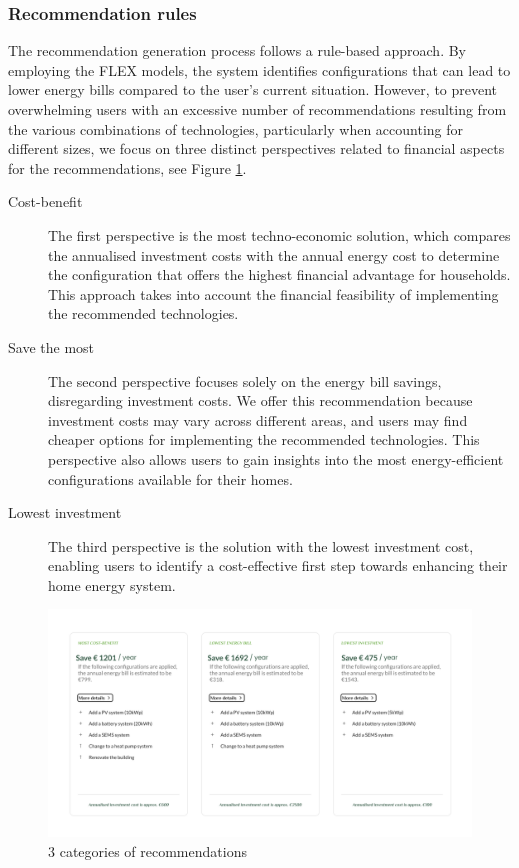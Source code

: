 \subsubsection{Recommendation rules}

The recommendation generation process follows a rule-based approach. 
By employing the FLEX models, the system identifies configurations that can lead to lower energy bills compared to the user's current situation.
However, to prevent overwhelming users with an excessive number of recommendations resulting from the various combinations of technologies, particularly when accounting for different sizes, 
we focus on three distinct perspectives related to financial aspects for the recommendations, see Figure \ref{fig:categories}.

\begin{description}
  \item[Cost-benefit] The first perspective is the most techno-economic solution, which compares the annualised investment costs with the annual energy cost to determine the configuration that offers the highest financial advantage for households. 
  This approach takes into account the financial feasibility of implementing the recommended technologies.
  \item[Save the most] The second perspective focuses solely on the energy bill savings, disregarding investment costs. 
  We offer this recommendation because investment costs may vary across different areas, and users may find cheaper options for implementing the recommended technologies.
  This perspective also allows users to gain insights into the most energy-efficient configurations available for their homes.
  \item[Lowest investment] The third perspective is the solution with the lowest investment cost, enabling users to identify a cost-effective first step towards enhancing their home energy system.
\end{description}

\begin{figure}[h!]
  \centering
  \includegraphics[width=\textwidth]{Images/rec_categories.png}
  \caption{3 categories of recommendations}
  \label{fig:categories}
\end{figure}

